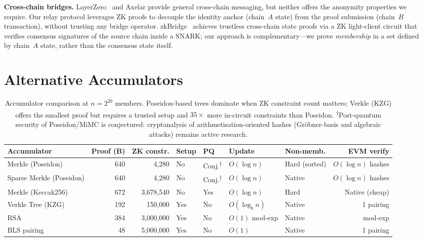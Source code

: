 \documentclass[conference]{IEEEtran}
\begin{document}
\textbf{Cross-chain bridges.}
LayerZero~\cite{LayerZero} and Axelar provide general cross-chain
messaging, but neither offers the anonymity properties we require.
Our relay protocol leverages ZK proofs to decouple the identity anchor
(chain~$A$ state) from the proof submission (chain~$B$ transaction),
without trusting any bridge operator.
zkBridge~\cite{zkBridge} achieves trustless cross-chain state proofs via
a ZK light-client circuit that verifies consensus signatures of the source
chain inside a SNARK; our approach is complementary---we prove \emph{membership}
in a set defined by chain~$A$ state, rather than the consensus state itself.

\section{Alternative Accumulators}
\label{sec:accumulators}

\begin{table}[t]
\caption{Accumulator comparison at $n = 2^{20}$ members.
Poseidon-based trees dominate when ZK constraint count matters;
Verkle (KZG) offers the smallest proof but requires a trusted setup
and $35\times$ more in-circuit constraints than Poseidon.
\textsuperscript{$\dagger$}Post-quantum security of Poseidon/MiMC
is conjectured: cryptanalysis of arithmetisation-oriented hashes
(Gr\"{o}bner-basis and algebraic attacks) remains active research.}
\label{tab:accumulators}
\centering
\footnotesize
\begin{tabular}{lrrllllr}
\toprule
\textbf{Accumulator} & \textbf{Proof (B)} & \textbf{ZK constr.}
  & \textbf{Setup} & \textbf{PQ}
  & \textbf{Update} & \textbf{Non-memb.}
  & \textbf{EVM verify} \\
\midrule
Merkle (Poseidon)         & 640  &   4{,}280   & No  & Conj.\textsuperscript{$\dagger$} & $O(\log n)$ & Hard (sorted) & $O(\log n)$ hashes \\
Sparse Merkle (Poseidon)  & 640  &   4{,}280   & No  & Conj.\textsuperscript{$\dagger$} & $O(\log n)$ & Native        & $O(\log n)$ hashes \\
Merkle (Keccak256)        & 672  & 3{,}678{,}540 & No & Yes & $O(\log n)$ & Hard          & Native (cheap)  \\
Verkle Tree (KZG)         & 192  &   150{,}000 & Yes & No  & $O(\log_b n)$ & Native       & 1 pairing \\
RSA~\cite{RSAAccumulator} & 384  & 3{,}000{,}000 & Yes & No & $O(1)$ mod-exp & Native~\cite{Wesolowski} & mod-exp \\
BLS pairing~\cite{KZG}    &  48  & 5{,}000{,}000 & Yes & No & $O(1)$         & Native       & 1 pairing \\
\bottomrule
\end{tabular}
\end{table}
\end{document}
